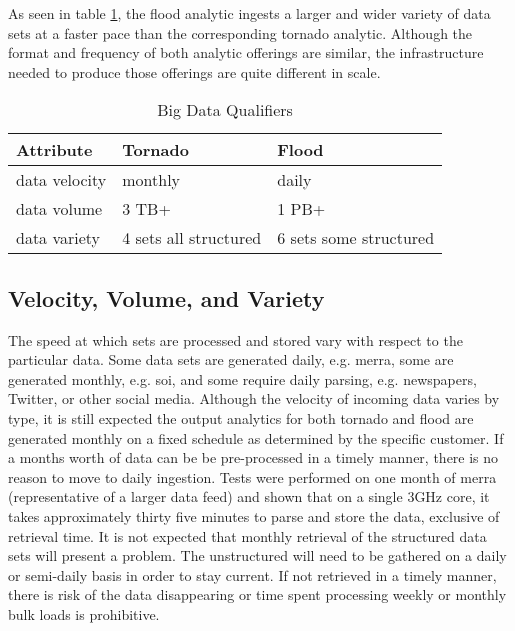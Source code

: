 As seen in table \ref{qualifiers}, the flood analytic ingests a larger and wider variety of data sets at a faster pace than the corresponding tornado analytic. Although the format and frequency of both analytic offerings are similar, the infrastructure needed to produce those offerings are quite different in scale.
\begin{table}[htbp]
    \centering
    \begin{tabular}{l l l}
        \hline
        Attribute & Tornado & Flood\\ [0.5ex]
        \hline
        data velocity & monthly & daily\\
        data volume &  3 TB+  & 1 PB+\\
        data variety &  4 sets all structured & 6 sets some structured\\
        \hline
    \end{tabular}
    \caption{Big Data Qualifiers}
    \label{qualifiers}
\end{table}
\subsection{Velocity, Volume, and Variety}
The speed at which sets are processed and stored vary with respect to the particular data. Some data sets are generated daily, e.g. \gls{merra}, some are generated monthly, e.g. \gls{soi}, and some require daily parsing, e.g. newspapers, Twitter, or other social media. Although the velocity of incoming data varies by type, it is still expected the output analytics for both tornado and flood are generated monthly on a fixed schedule as determined by the specific customer. If a months worth of data can be be pre-processed in a timely manner, there is no reason to move to daily ingestion. Tests were performed on one month of  \gls{merra} (representative of a larger data feed) and shown that on a single 3GHz core, it takes approximately thirty five minutes to parse and store the data, exclusive of retrieval time. It is not expected that monthly retrieval of the structured data sets will present a problem. The unstructured will need to be gathered  on a daily or semi-daily basis in order to stay current. If not retrieved in a timely manner, there is risk of the data disappearing or time spent processing weekly or monthly bulk loads is prohibitive.\\

